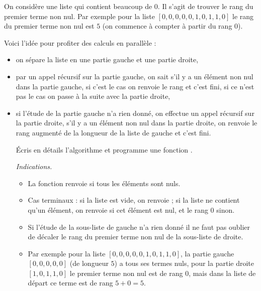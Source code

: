 \documentclass[11pt,class=report,crop=false]{standalone}
\begin{document}
\begin{activite}
\begin{enumerate}
    On considère une liste qui contient beaucoup de $0$. Il s'agit de trouver le rang du premier terme non nul. Par exemple pour la liste $[0,0,0,0,0,1,0,1,1,0]$ le rang du premier terme non nul est $5$ (on commence à compter à partir du rang $0$). 
    
    Voici l'idée pour profiter des calculs en parallèle : 
    \begin{itemize} 
      \item on sépare la liste en une partie gauche et une partie droite,
      \item par un appel récursif sur la partie gauche, on sait s'il y a un élément non nul dans la partie gauche, si c'est le cas on renvoie le rang et c'est fini, si ce n'est pas le cas on passe à la suite avec la partie droite,
      \item si l'étude de la partie gauche n'a rien donné, on effectue un appel récursif sur la partie droite,  s'il y a un élément non nul dans la partie droite, on renvoie le rang augmenté de la longueur de la liste de gauche et c'est fini.
      
      Écris en détails l'algorithme et programme une fonction .
      
      \emph{Indications.}
      \begin{itemize}
        \item La fonction renvoie  si tous les éléments sont nuls.
        \item Cas terminaux : si la liste est vide, on renvoie  ; si la liste ne contient qu'un élément, on renvoie  si cet élément est nul, et le rang $0$ sinon.
        \item Si l'étude de la sous-liste de gauche n'a rien donné il ne faut pas oublier de décaler le rang du premier terme non nul de la sous-liste de droite. 
        \item Par exemple pour la liste  
 $[0,0,0,0,0,1,0,1,1,0]$, la partie gauche $[0,0,0,0,0]$ (de longueur $5$) a tous ses termes nuls,  pour la partie droite $[1,0,1,1,0]$ le premier terme non nul est de rang $0$, mais dans la liste de départ ce terme est de rang $5+0=5$.
      \end{itemize}
   \end{itemize}   
  \end{enumerate}
     
\end{activite}

\end{document}
